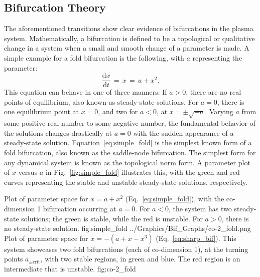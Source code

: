 \subsection{Bifurcation Theory}\label{ssec:bif_theory}
The aforementioned transitions show clear evidence of bifurcations in the plasma system.
Mathematically, a bifurcation is defined to be a topological or qualitative change in a system when a small and smooth change of a parameter is made.
A simple example for a fold bifurcation is the following, with $a$ representing the parameter:
\begin{equation} %
	\frac{\text{d}x}{\text{d}t} \,=\, \dot{x} \,=\, a + x^2.
	\label{eq:simple_fold}
\end{equation}
This equation can behave in one of three manners:
If $a > 0$, there are no real points of equilibrium, also known as steady-state solutions.
For $a = 0$, there is one equilibrium point at $x = 0$, and two for $a < 0$, at $x = \pm\sqrt{-a}$.
Varying $a$ from some positive real number to some negative number, the fundamental behavior of the solutions changes drastically at $a = 0$ with the sudden appearance of a steady-state solution.
Equation~\ref{eq:simple_fold} is the simplest known form of a fold bifurcation, also known as the saddle-node bifurcation.
The simplest form for any dynamical system is known as the topological norm form.
A parameter plot of $x$ versus $a$ in Fig.~\ref{fig:simple_fold} illustrates this, with the green and red curves representing the stable and unstable steady-state solutions, respectively.

	{Plot of parameter space for $\dot{x} = a + x^2$ (Eq.~\ref{eq:simple_fold}), with the co-dimension 1 bifurcation occurring at $a = 0$. %
	For $a < 0$, the system has two steady-state solutions; the green is stable, while the red is unstable.
	For $a > 0$, there is no steady-state solution.}
	{fig:simple_fold}
	{../Graphics/Bif_Graphs/co-2_fold.png}
	{Plot of parameter space for $\dot{x} = -(a + x - x^3)$ (Eq.~\ref{eq:sharp_bif}). %
	This system showcases two fold bifurcations (each of co-dimension 1), at the turning points $a_{\pm\text{crit}}$, with two stable regions, in green and blue. %
	The red region is an intermediate that is unstable.}
	{fig:co-2_fold}

